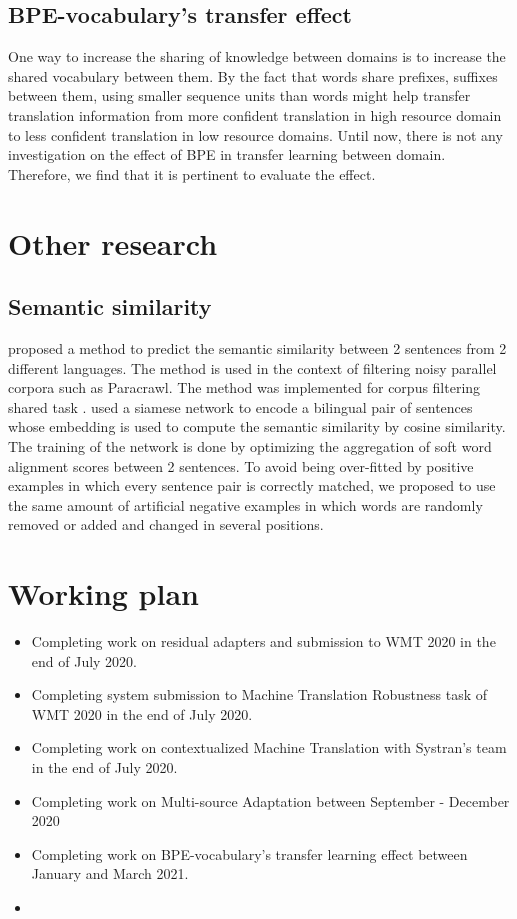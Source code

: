 \documentclass[12pt,a4paper,twoside]{report}
\theoremstyle{definition}
\begin{document}
\subsection*{BPE-vocabulary's transfer effect}
One way to increase the sharing of knowledge between domains is to increase the shared vocabulary between them. By the fact that words share prefixes, suffixes between them, using smaller sequence units than words might help transfer translation information from more confident translation in high resource domain to less confident translation in low resource domains. Until now, there is not any investigation on the effect of BPE in transfer learning between domain. Therefore, we find that it is pertinent to evaluate the effect.

\section*{Other research}
\subsection*{Semantic similarity}
\cite{pham18fixing} proposed a method to predict the semantic similarity between 2 sentences from 2 different languages. The method is used in the context of filtering noisy parallel corpora such as Paracrawl. The method was implemented for corpus filtering shared task  \cite{koehn18findings}. \cite{pham18fixing} used a siamese network to encode a bilingual pair of sentences whose embedding is used to compute the semantic similarity by cosine similarity. The training of the network is done by optimizing the aggregation of soft word alignment scores between 2 sentences. To avoid being over-fitted by positive examples in which every sentence pair is correctly matched, we proposed to use the same amount of artificial negative examples in which words are randomly removed or added and changed in several positions.
\section*{Working plan}
\begin{itemize}
	\item Completing work on residual adapters and submission to WMT 2020 in the end of July 2020.
	\item Completing system submission to Machine Translation Robustness task of WMT 2020 in the end of July 2020.
	\item Completing work on contextualized Machine Translation with Systran's team in the end of July 2020.
	\item Completing work on Multi-source Adaptation between September - December 2020
	\item Completing work on BPE-vocabulary's transfer learning effect between January and March 2021.
	\item 
\end{itemize}


\end{document}
